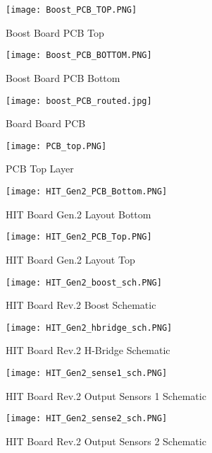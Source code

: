 \begin{figure}[h]
\centering
\texttt{[image: Boost\_PCB\_TOP.PNG]}
\caption{Boost Board PCB Top}
\label{boostPCBTop}
\end{figure}

\begin{figure}[h]
\centering
\texttt{[image: Boost\_PCB\_BOTTOM.PNG]}
\caption{Boost Board PCB Bottom}
\label{boostPCBBottom}
\end{figure}

\begin{figure}[h]
\centering
\texttt{[image: boost\_PCB\_routed.jpg]}
\caption{Board Board PCB}
\label{unpopulatedBoostPCB}
\end{figure}

\begin{figure}[h]
\centering
\texttt{[image: PCB\_top.PNG]}
\caption{PCB Top Layer}
\label{PCB top}
\end{figure}

\begin{figure}[h]
\centering
\texttt{[image: HIT\_Gen2\_PCB\_Bottom.PNG]}
\caption{HIT Board Gen.2 Layout Bottom}
\label{HIT Board Gen2 Bottom}
\end{figure}

\begin{figure}[h]
\centering
\texttt{[image: HIT\_Gen2\_PCB\_Top.PNG]}
\caption{HIT Board Gen.2 Layout Top}
\label{HIT Board Gen2 Top}
\end{figure}

\begin{figure}[h]
\centering
\texttt{[image: HIT\_Gen2\_boost\_sch.PNG]}
\caption{HIT Board Rev.2 Boost Schematic}
\label{Rev2 boost sch}
\end{figure}


\begin{figure}[h]
\centering
\texttt{[image: HIT\_Gen2\_hbridge\_sch.PNG]}
\caption{HIT Board Rev.2 H-Bridge Schematic}
\label{Rev2 hbridge sch}
\end{figure}

\begin{figure}[h]
\centering
\texttt{[image: HIT\_Gen2\_sense1\_sch.PNG]}
\caption{HIT Board Rev.2 Output Sensors 1 Schematic}
\label{Rev2 sense1 sch}
\end{figure}

\begin{figure}[h]
\centering
\texttt{[image: HIT\_Gen2\_sense2\_sch.PNG]}
\caption{HIT Board Rev.2 Output Sensors 2 Schematic}
\label{Rev2 sense2 sch}
\end{figure}

